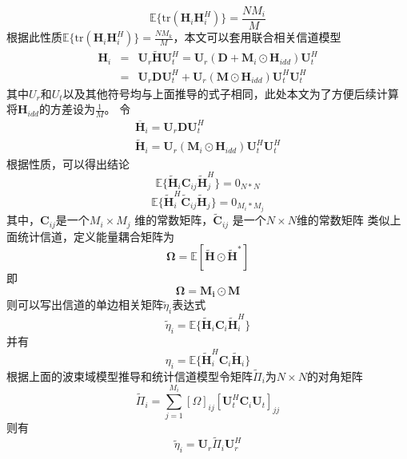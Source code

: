 \documentclass[bachelor,nocolorlinks, printoneside]{seuthesis} %
\begin{document}
\begin{Main}
\begin{equation}
\mathbb{E} \lbrace \mathrm{tr} (\mathbf{H}_i \mathbf{H}_i^H ) \rbrace = \frac{N M_i}{M}
\end{equation}
根据此性质$\mathbb{E} \lbrace \mathrm{tr} (\mathbf{H}_i \mathbf{H}_i^H ) \rbrace = \frac{N M_k}{M}$，本文可以套用联合相关信道模型
\begin{eqnarray}\label{key}
\mathbf{H}_i & = & \mathbf{U}_{r}\tilde{\mathbf{H}}\mathbf{U}_{t}^{H} = \mathbf{U}_{r}(\mathbf{D}+\mathbf{M}_i\odot \mathbf{H}_{idd})\mathbf{U}_{t}^{H} \\ \nonumber
& = & \mathbf{U}_{r}\mathbf{D}\mathbf{U}_{t}^{H} + \mathbf{U}_{r}(\mathbf{M}\odot \mathbf{H}_{idd})\mathbf{U}_{t}^{H}\mathbf{U}_{t}^{H}
\end{eqnarray}
其中$U_r$和$U_t$以及其他符号均与上面推导的式子相同，此处本文为了方便后续计算将$\mathbf{H}_{idd}$的方差设为$\frac{1}{M}$。
令
\begin{gather}\label{key}
\overline{\mathbf{H}}_i = \mathbf{U}_{r}\mathbf{D}\mathbf{U}_{t}^{H} \\
\tilde{\mathbf{H}}_i = \mathbf{U}_{r}(\mathbf{M}_i\odot \mathbf{H}_{idd})\mathbf{U}_{t}^{H}\mathbf{U}_{t}^{H}
\end{gather}
根据性质，可以得出结论
\begin{equation}\label{key}
\mathbb{E} \lbrace \tilde{\mathbf{H}}_i \mathbf{C}_{ij} \tilde{\mathbf{H}}_j^{H} \rbrace = 0_{N*N}
\end{equation}
\begin{equation}\label{key}
\mathbb{E} \lbrace \tilde{\mathbf{H}}_i^{H} \tilde{\mathbf{C}}_{ij} \tilde{\mathbf{H}}_j \rbrace = 0_{M_i*M_j}
\end{equation}
其中，$\mathbf{C}_{ij}$是一个$M_i \times M_j$ 维的常数矩阵，$\tilde{\mathbf{C}}_{ij}$ 是一个$N \times N$维的常数矩阵
类似上面统计信道，定义能量耦合矩阵为
\begin{equation}\label{key}
\bm{\Omega} =\mathbb{E}[\tilde{\mathbf{H}} \odot \tilde{\mathbf{H}}^{*}]
\end{equation}
即
\begin{equation}\label{key}
\bm{\Omega} =\mathbf{M_i} \odot \mathbf{M}
\end{equation}
则可以写出信道的单边相关矩阵$\tilde{\eta}_i$表达式
\begin{equation}\label{key}
\tilde{\eta}_i = \mathbb{E} \lbrace \tilde{\mathbf{H}}_i \mathbf{C}_i \tilde{\mathbf{H}}_i^H \rbrace
\end{equation}
并有
\begin{equation}\label{key}
{\eta}_i = \mathbb{E} \lbrace \tilde{\mathbf{H}}_i^H \mathbf{C}_i \tilde{\mathbf{H}}_i \rbrace
\end{equation}
根据上面的波束域模型推导和统计信道模型令矩阵$\tilde{\Pi}_i$为$N \times N$的对角矩阵
\begin{equation}\label{key}
\tilde{\Pi}_i = \sum_{j=1}^{M_i}[\Omega]_{ij}  [\mathbf{U}_t^H \mathbf{C}_i \mathbf{U}_t]_{jj}
\end{equation}
则有
\begin{equation}\label{key}
\tilde{\eta}_i = \mathbf{U}_r \tilde{\Pi}_i \mathbf{U}_r^H
\end{equation}




\end{Main}
\end{document}
